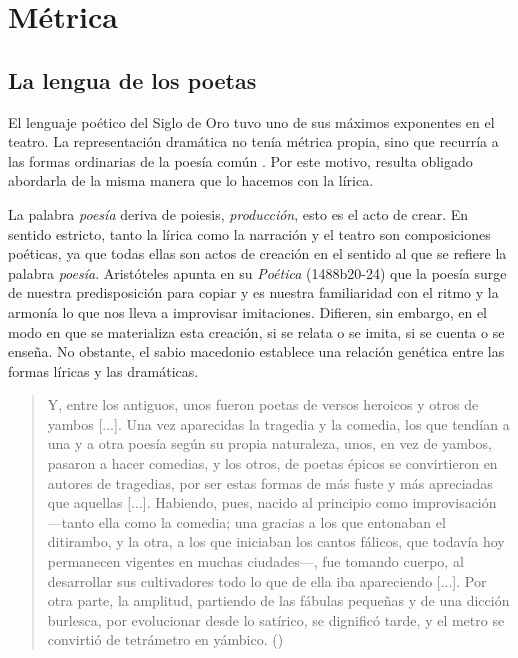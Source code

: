 \chapter{Métrica}

\section{La lengua de los poetas}
El lenguaje poético del Siglo de Oro tuvo uno de sus máximos exponentes en el teatro. La representación dramática no tenía métrica propia, sino que recurría a las formas ordinarias de la poesía común \parencite[251]{navarrotomas1991}. Por este motivo, resulta obligado abordarla de la misma manera que lo hacemos con la lírica.
 
La palabra \textit{poesía} deriva de poiesis, \textit{producción}, esto es el acto de crear. En sentido estricto, tanto la lírica como la narración y el teatro son composiciones poéticas, ya que todas ellas son actos de creación en el sentido al que se refiere la palabra \textit{poesía}. Aristóteles apunta en su \textit{Poética} (1488b20-24) que la poesía surge de nuestra predisposición para copiar y es nuestra familiaridad con el ritmo y la armonía lo que nos lleva a improvisar imitaciones. Difieren, sin embargo, en el modo en que se materializa esta creación, si se relata o se imita, si se cuenta o se enseña. No obstante, el sabio macedonio establece una relación genética entre las formas líricas y las dramáticas.

\blockquote{Y, entre los antiguos, unos fueron poetas de versos heroicos y otros de yambos [...]. Una vez aparecidas la tragedia y la comedia, los que tendían a una y a otra poesía según su propia naturaleza, unos, en vez de yambos, pasaron a hacer comedias, y los otros, de poetas épicos se convirtieron en autores de tragedias, por ser estas formas de más fuste y más apreciadas que aquellas [...]. Habiendo, pues, nacido al principio como improvisación —tanto ella como la comedia; una gracias a los que entonaban el ditirambo, y la otra, a los que iniciaban los cantos fálicos, que todavía hoy permanecen vigentes en muchas ciudades—, fue tomando cuerpo, al desarrollar sus cultivadores todo lo que de ella iba apareciendo [...]. Por otra parte, la amplitud, partiendo de las fábulas pequeñas y de una dicción burlesca, por evolucionar desde lo satírico, se dignificó tarde, y el metro se convirtió de tetrámetro en yámbico. ()}

